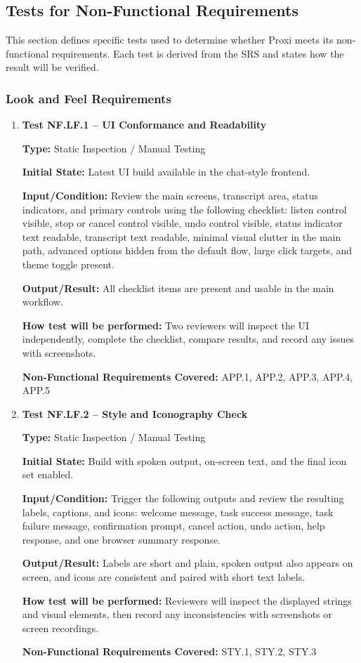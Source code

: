 \documentclass[12pt, titlepage]{article}
\begin{document}
\subsection{Tests for Non-Functional Requirements}

This section defines specific tests used to determine whether Proxi meets
its non-functional requirements. Each test is derived from the SRS and
states how the result will be verified.

\subsubsection{Look and Feel Requirements}

\begin{enumerate}

\item \textbf{Test NF.LF.1 -- UI Conformance and Readability}

\textbf{Type:} Static Inspection / Manual Testing

\textbf{Initial State:} Latest UI build available in the chat-style
frontend.

\textbf{Input/Condition:} Review the main screens, transcript area,
status indicators, and primary controls using the following checklist:
listen control visible, stop or cancel control visible, undo control
visible, status indicator text readable, transcript text readable,
minimal visual clutter in the main path, advanced options hidden from
the default flow, large click targets, and theme toggle present.

\textbf{Output/Result:} All checklist items are present and usable in the
main workflow.

\textbf{How test will be performed:} Two reviewers will inspect the UI
independently, complete the checklist, compare results, and record any
issues with screenshots.

\textbf{Non-Functional Requirements Covered:} APP.1, APP.2, APP.3,
APP.4, APP.5

\item \textbf{Test NF.LF.2 -- Style and Iconography Check}

\textbf{Type:} Static Inspection / Manual Testing

\textbf{Initial State:} Build with spoken output, on-screen text, and
the final icon set enabled.

\textbf{Input/Condition:} Trigger the following outputs and review the
resulting labels, captions, and icons:
welcome message, task success message, task failure message,
confirmation prompt, cancel action, undo action, help response, and one
browser summary response.

\textbf{Output/Result:} Labels are short and plain, spoken output also
appears on screen, and icons are consistent and paired with short text
labels.

\textbf{How test will be performed:} Reviewers will inspect the
displayed strings and visual elements, then record any inconsistencies
with screenshots or screen recordings.

\textbf{Non-Functional Requirements Covered:} STY.1, STY.2, STY.3

\end{enumerate}
\end{document}
